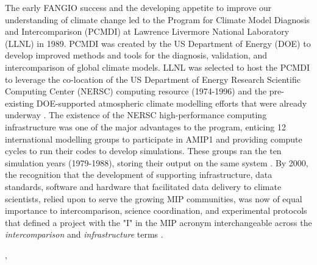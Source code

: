 \documentclass[gmd, preprint]{copernicus}
\def\cred#1{{\color{red}#1}}
\begin{document}
The early FANGIO success and the developing appetite to improve our understanding of climate change led to the Program for Climate Model Diagnosis and Intercomparison (PCMDI) at Lawrence Livermore National Laboratory (LLNL) in 1989. PCMDI was created by the US Department of Energy (DOE) to develop improved methods and tools for the diagnosis, validation, and intercomparison of global climate models. LLNL was selected to host the PCMDI to leverage the co-location of the US Department of Energy Research Scientific Computing Center (NERSC) computing resource (1974-1996) and the pre-existing DOE-supported atmospheric climate modelling efforts that were already underway \citep{potter_celebrating_2011}. The existence of the NERSC high-performance computing infrastructure was one of the major advantages to the program, enticing 12 international modelling groups to participate in AMIP1 and providing compute cycles to run their codes to develop simulations. These groups ran the ten simulation years (1979-1988), storing their output on the same system \citep{gates_amip_1991, gates_amip_1992}. By 2000, the recognition that the development of supporting infrastructure, data standards, software and hardware that facilitated data delivery to climate scientists, relied upon to serve the growing MIP communities, was now of equal importance to intercomparison, science coordination, and experimental protocols that defined a project with the "I" in the MIP acronym interchangeable across the \textit{intercomparison} and \emph{infrastructure} terms \citep{gleckler_amip_2001}.

\cred{\citet{balaji_requirements_2018}, \citet{petrie_coordinating_2021}}
\end{document}
